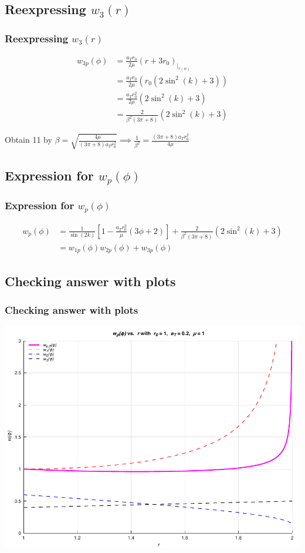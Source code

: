 \documentclass{beamer}
\newcommand{\sectit}[1]{
    \section{\texorpdfstring{#1}{}}
    \frametitle{#1}
}
\begin{document}
\begin{frame}
    \sectit{Reexpressing $w_3(r)$}

    \begin{align}
        w_{3p}(\phi)&=\frac{a_Tr_0}{2\mu}(r+3r_0)_{\big\rvert_{r(\phi)}}\\
        &=\frac{a_Tr_0}{2\mu}(r_0(2\sin^2(k)+3))\\
        &=\frac{a_Tr_0^2}{2\mu}(2\sin^2(k)+3)\\
        &=\frac{2}{\beta^2(3\pi+8)}(2\sin^2(k)+3)
    \end{align}

    Obtain 11 by $\beta=\sqrt{\frac{4\mu}{(3\pi+8)a_Tr_0^2}}\implies \frac{1}{\beta^2}=\frac{(3\pi+8)a_Tr_0^2}{4\mu}$
\end{frame}

\begin{frame}
    \sectit{Expression for $w_p(\phi)$}

    \begin{align}
        w_p(\phi)&=\frac{1}{\sin(2k)}\left[1-\frac{a_Tr_0^2}{\mu}\left(3\phi+2\right)\right]+\frac{2}{\beta^2(3\pi+8)}(2\sin^2(k)+3)\\ %
        &=w_{1p}(\phi)w_{2p}(\phi)+w_{3p}(\phi)
    \end{align}
\end{frame}

\begin{frame}
    \sectit{Checking answer with plots}

    \begin{center}
        \includegraphics[scale=0.7]{plots/partA_phi.pdf}
    \end{center}
\end{frame}
\end{document}
